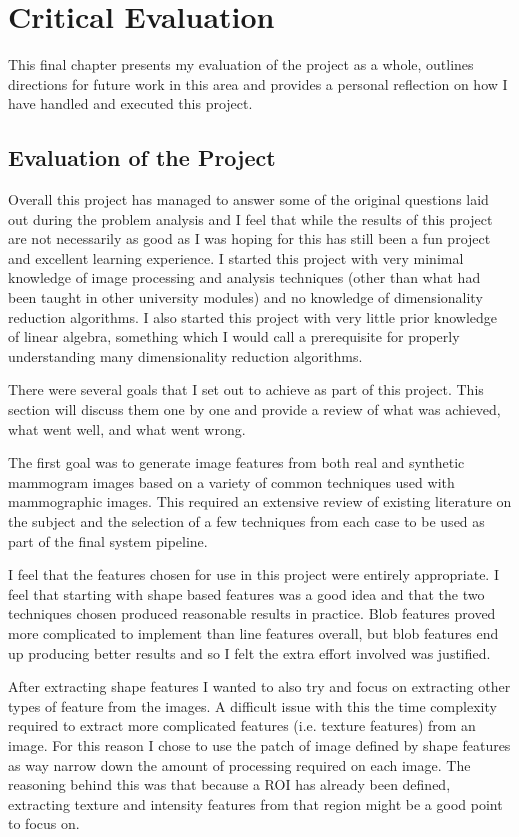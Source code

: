 \chapter{Critical Evaluation}
This final chapter presents my evaluation of the project as a whole, outlines directions for future work in this area and provides a personal reflection on how I have handled and executed this project.

\section{Evaluation of the Project}
Overall this project has managed to answer some of the original questions laid out during the problem analysis and I feel that while the results of this project are not necessarily  as good as I was hoping for this has still been a fun project and excellent learning experience. I started this project with very minimal knowledge of image processing and analysis techniques (other than what had been taught in other university modules) and no knowledge of dimensionality reduction algorithms. I also started this project with very little prior knowledge of linear algebra, something which I would call a prerequisite for properly understanding many dimensionality reduction algorithms.

There were several goals that I set out to achieve as part of this project. This section will discuss them one by one and provide a review of what was achieved, what went well, and what went wrong.

The first goal was to generate image features from both real and synthetic mammogram images based on a variety of common techniques used with mammographic images. This required an extensive review of existing literature on the subject and the selection of a few techniques from each case to be used as part of the final system pipeline.

I feel that the features chosen for use in this project were entirely appropriate. I feel that starting with shape based features was a good idea and that the two techniques chosen produced reasonable results in practice. Blob features proved more complicated to implement than line features overall, but blob features end up producing better results and so I felt the extra effort involved was justified. 

After extracting shape features I wanted to also try and focus on extracting other types of feature from the images. A difficult issue with this the time complexity required to extract more complicated features (i.e. texture features) from an image. For this reason I chose to use the patch of image defined by shape features as way narrow down the amount of processing required on each image. The reasoning behind this was that because a ROI has already been defined, extracting texture and intensity features from that region might be a good point to focus on.

